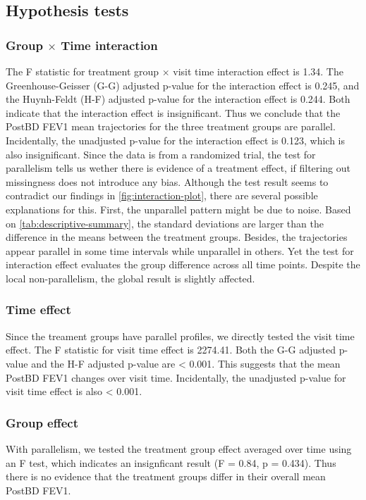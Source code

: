 \documentclass[12pt]{article}
\begin{document}
\subsection{Hypothesis tests}
\subsubsection{Group $\times$ Time interaction}
The F statistic for treatment group $\times$ visit time interaction effect
is 1.34.
The Greenhouse-Geisser (G-G) adjusted p-value for the 
interaction effect is 0.245,
and the Huynh-Feldt (H-F) adjusted p-value for the interaction effect is 0.244.
Both indicate that the interaction effect is insignificant.
Thus we conclude that the PostBD FEV1 mean trajectories for the three treatment groups
are parallel.
Incidentally, the unadjusted p-value for the interaction effect is 0.123,
which is also insignificant.
Since the data is from a randomized trial, the test for
parallelism tells us wether there is evidence of a treatment effect,
if filtering out missingness does not introduce any bias.
Although the test result seems to contradict our findings in \cref{fig:interaction-plot},
there are several possible explanations for this.
First, the unparallel pattern might be due to noise. Based on \cref{tab:descriptive-summary},
the standard deviations are larger than the difference in the means 
between the treatment groups.
Besides, the trajectories appear parallel in some time intervals
while unparallel in others. Yet the test for interaction effect
evaluates the group difference across all time points. Despite the 
local non-parallelism, the global result is slightly affected.

\subsubsection{Time effect}
Since the treament groups have parallel profiles, we directly
tested the visit time effect. The F statistic for visit time effect is 2274.41.
Both the G-G adjusted p-value and the H-F adjusted p-value are < 0.001.
This suggests that the mean PostBD FEV1 changes over visit time.
Incidentally, the unadjusted p-value for visit time effect is also < 0.001.

\subsubsection{Group effect}
With parallelism, we tested the treatment group effect
averaged over time using an F test,
which indicates an insignficant result
(F = 0.84, p = 0.434). Thus there is no evidence that the treatment groups
differ in their overall mean PostBD FEV1.
\end{document}
